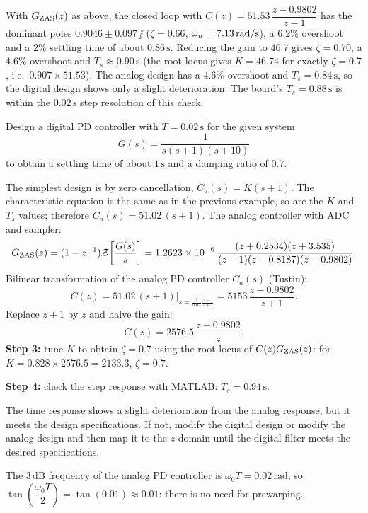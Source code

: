 \begin{remark}
With $G_{\mathrm{ZAS}}(z)$ as above, the closed loop with $C(z)=51.53\,\dfrac{z-0.9802}{z-1}$ has the dominant poles
$0.9046\pm0.097\,\jj$ ($\zeta=0.66$, $\omega_n=7.13\,\mathrm{rad/s}$), a $6.2\%$ overshoot and a $2\%$ settling time of about $0.86\,\mathrm{s}$.
Reducing the gain to $46.7$ gives $\zeta=0.70$, a $4.6\%$ overshoot and $T_s\approx0.90\,\mathrm{s}$ (the root locus gives $K=46.74$ for exactly
$\zeta=0.7$, i.e.\ $0.907\times51.53$). The analog design has a $4.6\%$ overshoot and $T_s=0.84\,\mathrm{s}$, so the digital design
shows only a slight deterioration. The board's $T_s=0.88\,\mathrm{s}$ is within the $0.02\,\mathrm{s}$ step resolution of this check.
\end{remark}

\begin{example}
Design a digital PD controller with $T=0.02\,\mathrm{s}$ for the given system
\[
  G(s)=\frac{1}{s(s+1)(s+10)}
\]
to obtain a settling time of about $1\,\mathrm{s}$ and a damping ratio of $0.7$.

The simplest design is by zero cancellation, $C_a(s)=K(s+1)$. The characteristic equation is the same as in the previous
example, so are the $K$ and $T_s$ values; therefore $C_a(s)=51.02\,(s+1)$. The analog controller with ADC and sampler:
\[
  G_{\mathrm{ZAS}}(z)=(1-z^{-1})\mathcal{Z}\!\left[\frac{G(s)}{s}\right]=1.2623\times10^{-6}\,\frac{(z+0.2534)(z+3.535)}{(z-1)(z-0.8187)(z-0.9802)}.
\]
Bilinear transformation of the analog PD controller $C_a(s)$ (Tustin):
\[
  C(z)=51.02\,(s+1)\Big|_{s=\frac{2}{0.02}\frac{z-1}{z+1}}=5153\,\frac{z-0.9802}{z+1}.
\]
Replace $z+1$ by $z$ and halve the gain:
\[
  C(z)=2576.5\,\frac{z-0.9802}{z}.
\]
\textbf{Step 3:} tune $K$ to obtain $\zeta=0.7$ using the root locus of $C(z)G_{\mathrm{ZAS}}(z)$: for $K=0.828\times2576.5=2133.3$, $\zeta=0.7$.

\textbf{Step 4:} check the step response with MATLAB: $T_s=0.94\,\mathrm{s}$.
\end{example}
The time response shows a slight deterioration from the analog response, but it meets the design specifications. If not, modify the digital
design or modify the analog design and then map it to the $z$ domain until the digital filter meets the desired specifications.

The $3\,\mathrm{dB}$ frequency of the analog PD controller is $\omega_0T=0.02\,\mathrm{rad}$, so
$\tan\!\left(\dfrac{\omega_0T}{2}\right)=\tan(0.01)\approx0.01$: there is no need for prewarping.

